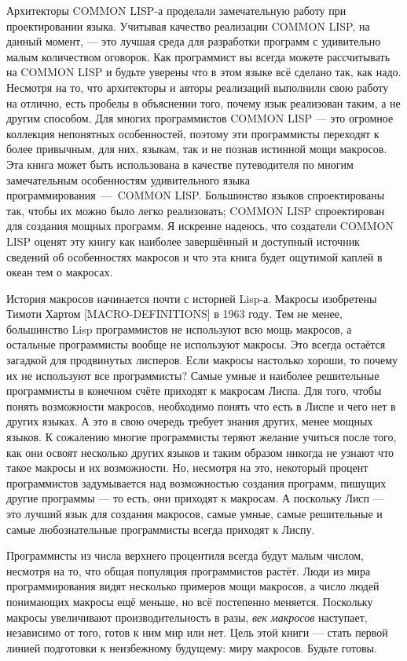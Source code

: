 Архитекторы COMMON LISP-а проделали замечательную ра\-бо\-ту при про\-ектировании языка. Учитывая качество реализации COMMON LISP, на данный момент, --- это лучшая среда для разработки программ с удивительно малым количеством оговорок. Как программист вы всегда можете рассчитывать на COMMON LISP и будьте уверены что в этом языке всё сделано так, как надо. Несмотря на то, что архитекторы и авторы реализаций выполнили свою работу на отлично, есть пробелы в объяснении того, почему язык реализован таким, а не другим способом. Для многих программистов COMMON LISP --- это огромное коллекция непонятных особенностей, поэтому эти программисты переходят к более привычным, для них, языкам, так и не познав истинной мощи макросов. Эта книга может быть использована в качестве путеводителя по многим замечательным особенностям удивительного языка программирования~---~COMMON LISP. Большинство языков спроектированы так, чтобы их можно было легко реализовать; COMMON LISP спроектирован для соз\-да\-ния мощных программ. Я искренне надеюсь, что создатели COMMON LISP оценят эту книгу как наиболее завершённый и доступный источник сведений об особенностях макросов и что эта книга будет ощутимой каплей в океан тем о макросах.

История макросов начинается почти с историей Lisp-а. Макросы изобретены Тимоти Хартом [MACRO-DEFINITIONS] в 1963 году. Тем не менее, большинство Lisp программистов не используют всю мощь макросов, а остальные программисты вообще не используют макросы. Это всегда остаётся загадкой для продвинутых лисперов. Если макросы настолько хороши, то почему их не используют все программисты? Са\-мые умные и наиболее решительные программисты в конечном счёте приходят к макросам Лиспа. Для того, чтобы понять возможности макросов, необходимо понять что есть в Лиспе и чего нет в других языках. А это в свою очередь требует знания других, менее мощных языков. К сожалению многие программисты теряют желание учиться после того, как они освоят несколько других языков и таким образом никогда не узнают что такое макросы и их возможности. Но, несмотря на это, некоторый процент программистов задумывается над возможностью создания программ, пишущих другие программы --- то есть, они приходят к макросам. А поскольку Лисп --- это лучший язык для создания мак\-ро\-сов, самые умные, самые решительные и самые любознательные про\-грам\-мис\-ты всегда приходят к Лиспу.

Программисты из числа верхнего процентиля всегда будут малым числом, несмотря на то, что общая популяция программистов растёт. Люди из мира программирования видят несколько примеров мощи мак\-ро\-сов, а число людей понимающих макросы ещё меньше, но всё пос\-те\-пен\-но меняется. Поскольку макросы увеличивают производительность в разы, \emph{век макросов} наступает, независимо от того, готов к ним мир или нет. Цель этой книги --- стать первой линией подготовки к неизбежному будущему: миру макросов. Будьте готовы.


